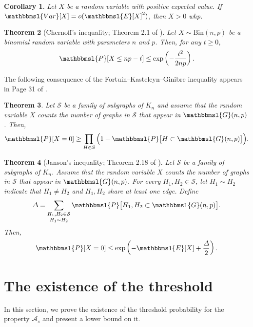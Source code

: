 \documentclass[hidelinks, 11pt]{article}
\theoremstyle{plain}
\newtheorem{theorem}{Theorem}[section]
\newtheorem{corollary}[theorem]{Corollary}
\theoremstyle{definition}
\begin{document}
\begin{corollary}\label{Second-Moment}
Let   $X$ be a     random variable   with positive   expected value. If   $\mathbbmsl{Var}[X]=o(\mathbbmsl{E}[X]^2)$, then $X>0$  whp.
\end{corollary}



\begin{theorem}[Chernoff's inequality;  Theorem 2.1 of  \cite{RG}]\label{chernoff}
Let   $X\sim\mathrm{Bin}(n,p)$ be a binomial random variable  with parameters $n$ and $p$. Then, for any  $t\geq 0$,
$$\mathbbmsl{P}[X\leq np-t]\leq\exp \left(-\frac{t^2}{2np}\right).$$
\end{theorem}


The following consequence  of the  Fortuin--Kasteleyn--Ginibre  inequality  \cite[Theorem 2.12]{RG}  appears in  Page 31 of \cite{RG}.


\begin{theorem}\label{FKG}
Let $\mathcal{S}$ be a family of subgraphs of $K_n$ and assume that   the random variable $X$    counts  the number of graphs in  $\mathcal{S}$ that appear in $\mathbbmsl{G}(n,p)$. Then,
$$\mathbbmsl{P}[X=0]\geq\prod_{H\in \mathcal{S}}\Big(1-\mathbbmsl{P}\big[H\subset\mathbbmsl{G}(n,p)\big]\Big).$$
\end{theorem}




\begin{theorem}[Janson's inequality;  Theorem 2.18 of \cite{RG}]\label{Janson}
Let $\mathcal{S}$ be a family of subgraphs of $K_n$. Assume that   the random variable $X$    counts  the number of graphs in  $\mathcal{S}$ that appear in $\mathbbmsl{G}(n,p)$. For every $H_1,H_2\in\mathcal{S}$, let $H_1\sim H_2$ indicate  that $H_1\neq H_2$ and $H_1, H_2$  share at least one edge. Define
$$\mathnormal{\Delta}=\mathop{\sum_{H_1, H_2\in\mathcal{S}}}_{H_1\sim H_2}\mathbbmsl{P}\big[H_1, H_2\subset\mathbbmsl{G}(n,p)\big].$$
Then,
$$\mathbbmsl{P}[X=0]\leq\exp\left(-\mathbbmsl{E}[X]+\frac{\mathnormal{\Delta}}{2}\right).$$
\end{theorem}



\section{The existence of the   threshold}\label{secLowerP}



In this section, we prove the existence of the  threshold probability  for the property   $\mathcal{A}_s$  and present a lower bound on it.
\end{document}
